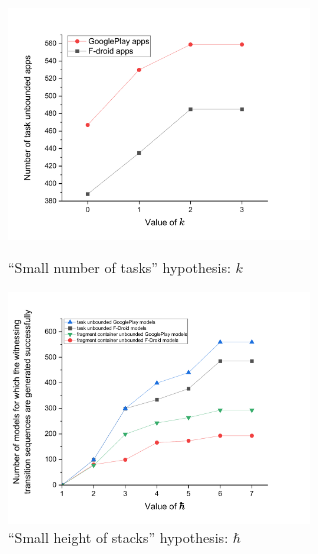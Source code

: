 \begin{figure}[htbp]
\centering
\begin{minipage}[t]{0.48\textwidth}
\centering
\includegraphics[width=8cm]{k.pdf}
\caption{``Small number of tasks'' hypothesis: $k$}
\label{fig:k}
\end{minipage}
\begin{minipage}[t]{0.48\textwidth}
\centering
\includegraphics[width=8cm]{h.pdf}
\caption{``Small height of stacks'' hypothesis: $\hbar$}
\label{fig-small-height}
\end{minipage}
\end{figure}
	





